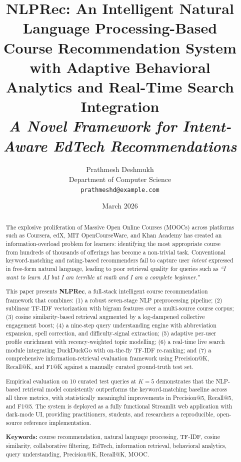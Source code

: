 \documentclass[12pt, a4paper]{article}
\title{
    \vspace{-1.5cm}
    \Large\textbf{NLPRec: An Intelligent Natural Language Processing-Based\\
    Course Recommendation System with Adaptive Behavioral\\
    Analytics and Real-Time Search Integration}\\[0.8em]
    \normalsize \textit{A Novel Framework for Intent-Aware EdTech Recommendations}
}
\author{
    Prathmesh Deshmukh\\
    \small Department of Computer Science\\
    \small \texttt{prathmeshd@example.com}
}
\date{March 2026}
\begin{document}
\maketitle
\thispagestyle{fancy}

\begin{abstract}
\noindent
The explosive proliferation of Massive Open Online Courses (MOOCs) across platforms such as
Coursera, edX, MIT OpenCourseWare, and Khan Academy has created an information-overload
problem for learners: identifying the most appropriate course from hundreds of thousands of
offerings has become a non-trivial task. Conventional keyword-matching and rating-based recommenders
fail to capture user \textit{intent} expressed in free-form natural language, leading to poor
retrieval quality for queries such as \textit{``I want to learn AI but I am terrible at math and
I am a complete beginner.''}

This paper presents \textbf{NLPRec}, a full-stack intelligent course recommendation framework
that combines: (1) a robust seven-stage NLP preprocessing pipeline; (2) sublinear TF-IDF
vectorization with bigram features over a multi-source course corpus; (3) cosine similarity-based
retrieval augmented by a log-dampened collective engagement boost; (4) a nine-step query
understanding engine with abbreviation expansion, spell correction, and difficulty-signal
extraction; (5) adaptive per-user profile enrichment with recency-weighted topic modelling;
(6) a real-time live search module integrating DuckDuckGo with on-the-fly TF-IDF re-ranking;
and (7) a comprehensive information-retrieval evaluation framework using Precision@K, Recall@K,
and F1@K against a manually curated ground-truth test set.

Empirical evaluation on 10 curated test queries at $K=5$ demonstrates that the NLP-based
retrieval model consistently outperforms the keyword-matching baseline across all three metrics,
with statistically meaningful improvements in Precision@5, Recall@5, and F1@5. The system is
deployed as a fully functional Streamlit web application with dark-mode UI, providing practitioners,
students, and researchers a reproducible, open-source reference implementation.

\vspace{6pt}
\noindent\textbf{Keywords:} course recommendation, natural language processing, TF-IDF, cosine similarity,
collaborative filtering, EdTech, information retrieval, behavioral analytics, query understanding,
Precision@K, Recall@K, MOOC.
\end{abstract}
\end{document}
